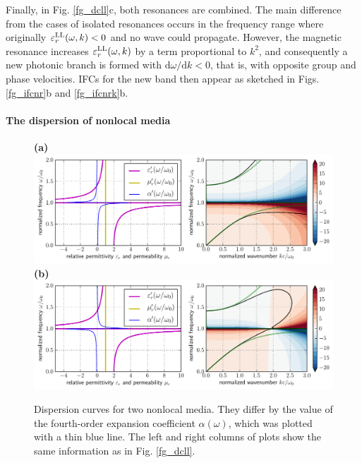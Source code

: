 Finally, in Fig. \ref{fg_dcll}c, both resonances are combined. The main difference from the cases of isolated resonances occurs in the frequency range where originally $\varepsilon_r^\text{LL}(\omega, k) < 0$ and no wave could propagate. However, the magnetic resonance increases $\varepsilon_r^\text{LL}(\omega, k)$ by a term proportional to $k^2$, and consequently a new photonic branch is formed with $\mathrm{d}\omega/\mathrm{d}k < 0$, that is, with opposite group and phase velocities. IFCs for the new band then appear as sketched in Figs. \ref{fg_ifcnr}b and \ref{fg_ifcnrk}b.


\paragraph{The dispersion of nonlocal media} %
\begin{figure}[t] \caption{Dispersion curves for two nonlocal media. They differ by the value of the fourth-order expansion coefficient $\alpha(\omega)$, which was plotted with a thin blue line. The left and right columns of plots show the same information as in Fig. \ref{fg_dcll}.  } \label{fg_dcll_nl} \centering  
\textbf{(a)}\\	\includegraphics[width=1\textwidth]{img/dispersion_landau_lifshitz/dispersion_ll_quadrupp.pdf}
\textbf{(b)}\\	\includegraphics[width=1\textwidth]{img/dispersion_landau_lifshitz/dispersion_ll_quadrupn.pdf}
\end{figure}


